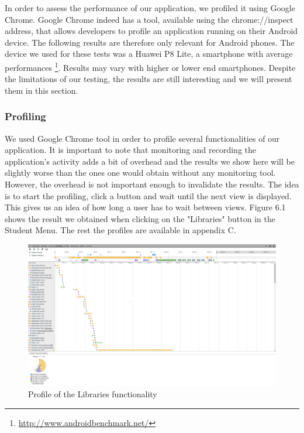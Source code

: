 \documentclass{eplmastersthesis}
\begin{document}
In order to assess the performance of our application, we profiled it using Google Chrome. Google Chrome indeed has a tool, available using the chrome://inspect address, that allows developers to profile an application running on their Android device. The following results are therefore only relevant for Android phones. The device we used for these tests was a Huawei P8 Lite, a smartphone with average performances \footnote{\url{http://www.androidbenchmark.net/}}. Results may vary with higher or lower end smartphones. Despite the limitations of our testing, the results are still interesting and we will present them in this section.
\subsubsection{Profiling}
We used Google Chrome tool in order to profile several functionalities of our application. It is important to note that monitoring and recording the application's activity adds a bit of overhead and the results we show here will be slightly worse than the ones one would obtain without any monitoring tool. However, the overhead is not important enough to invalidate the results. The idea is to start the profiling, click a button and wait until the next view is displayed. This gives us an idea of how long a user has to wait between views. Figure 6.1 shows the result we obtained when clicking on the "Libraries" button in the Student Menu. The rest the profiles are available in appendix C.\\

\begin{figure}
\centering
\includegraphics[scale = 0.25]{Images/libraries.png}
\caption{Profile of the Libraries functionality}
\end{figure}
\end{document}

